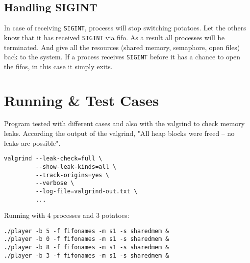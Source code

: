 \documentclass[a4paper]{article}
\begin{document}
\subsection{Handling SIGINT}
\label{sec:org54c10ae}
In case of receiving \texttt{SIGINT}, processs will stop switching potatoes. Let the others know that it has received \texttt{SIGINT} via fifo. As a result all processes will be terminated. And give all the resources (shared memory, semaphore, open files) back to the system.
If a process receives \texttt{SIGINT} before it has a chance to open the fifos, in this case it simply exits.
\newpage
\section{Running \& Test Cases}
\label{sec:org5fe5513}

Program tested with different cases and also with the valgrind to check memory leaks. According the output of the valgrind, "All heap blocks were freed -- no leaks are possible".

\begin{verbatim}
valgrind --leak-check=full \
         --show-leak-kinds=all \
         --track-origins=yes \
         --verbose \
         --log-file=valgrind-out.txt \
         ...
\end{verbatim}


Running with 4 processes and 3 potatoes:

\begin{verbatim}
./player -b 5 -f fifonames -m s1 -s sharedmem &
./player -b 0 -f fifonames -m s1 -s sharedmem &
./player -b 8 -f fifonames -m s1 -s sharedmem &
./player -b 3 -f fifonames -m s1 -s sharedmem &
\end{verbatim}
\end{document}
